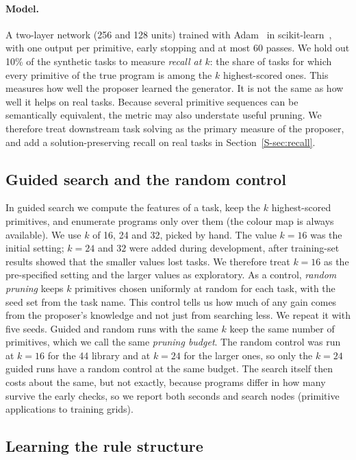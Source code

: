 \documentclass[sigconf,nonacm]{acmart}
\begin{document}
\paragraph{Model.} A two-layer network (256 and 128 units) trained with Adam~\cite{kingma2015adam} in scikit-learn~\cite{pedregosa2011sklearn}, with one output per primitive, early stopping and at most 60 passes. We hold out 10\% of the synthetic tasks to measure \emph{recall at $k$}: the share of tasks for which every primitive of the true program is among the $k$ highest-scored ones. This measures how well the proposer learned the generator. It is not the same as how well it helps on real tasks. Because several primitive sequences can be semantically equivalent, the metric may also understate useful pruning. We therefore treat downstream task solving as the primary measure of the proposer, and add a solution-preserving recall on real tasks in Section~\ref{S-sec:recall}.

\subsection{Guided search and the random control}

In guided search we compute the features of a task, keep the $k$ highest-scored primitives, and enumerate programs only over them (the colour map is always available). We use $k$ of 16, 24 and 32, picked by hand. The value $k=16$ was the initial setting; $k=24$ and $32$ were added during development, after training-set results showed that the smaller values lost tasks. We therefore treat $k=16$ as the pre-specified setting and the larger values as exploratory. As a control, \emph{random pruning} keeps $k$ primitives chosen uniformly at random for each task, with the seed set from the task name. This control tells us how much of any gain comes from the proposer's knowledge and not just from searching less. We repeat it with five seeds. Guided and random runs with the same $k$ keep the same number of primitives, which we call the same \emph{pruning budget}. The random control was run at $k=16$ for the 44 library and at $k=24$ for the larger ones, so only the $k=24$ guided runs have a random control at the same budget. The search itself then costs about the same, but not exactly, because programs differ in how many survive the early checks, so we report both seconds and search nodes (primitive applications to training grids).

\subsection{Learning the rule structure}
\label{sec:cell}
\end{document}
